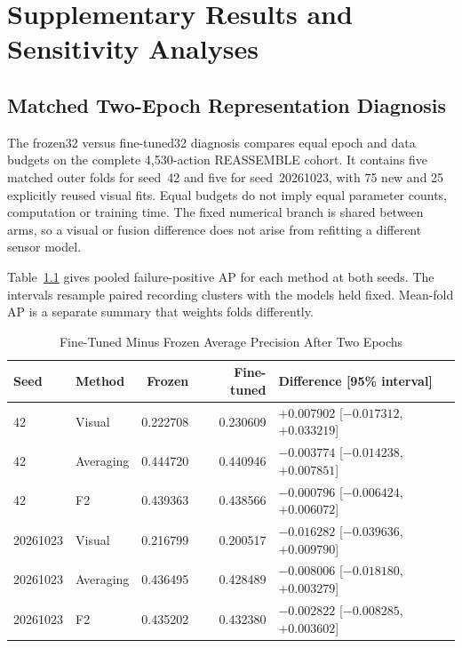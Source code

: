 \chapter{Supplementary Results and Sensitivity Analyses}
\label{app:supplementary-results}

\section{Matched Two-Epoch Representation Diagnosis}
The frozen32 versus fine-tuned32 diagnosis compares equal epoch and data budgets on the
complete 4,530-action REASSEMBLE cohort. It contains five matched outer folds for
seed~42 and five for seed~20261023, with 75 new and 25 explicitly reused visual fits.
Equal budgets do not imply equal parameter counts, computation or training time. The
fixed numerical branch is shared between arms, so a visual or fusion difference does not
arise from refitting a different sensor model.

Table~\ref{tab:twoepoch-supplement} gives pooled failure-positive AP for each method at
both seeds. The intervals resample paired recording clusters with the models held fixed.
Mean-fold AP is a separate summary that weights folds differently.

\begin{table}[htbp]
\caption{Fine-Tuned Minus Frozen Average Precision After Two Epochs}\label{tab:twoepoch-supplement}
\centering\small

\begin{tabular}{llrrl}\hline
Seed & Method & Frozen & Fine-tuned & Difference [95\% interval]\\\hline
42 & Visual &0.222708&0.230609&+0.007902 [$-0.017312$, $+0.033219$]\\
42 & Averaging &0.444720&0.440946&$-0.003774$ [$-0.014238$, $+0.007851$]\\
42 & F2 &0.439363&0.438566&$-0.000796$ [$-0.006424$, $+0.006072$]\\
20261023 & Visual &0.216799&0.200517&$-0.016282$ [$-0.039636$, $+0.009790$]\\
20261023 & Averaging &0.436495&0.428489&$-0.008006$ [$-0.018180$, $+0.003279$]\\
20261023 & F2 &0.435202&0.432380&$-0.002822$ [$-0.008285$, $+0.003602$]\\\hline
\end{tabular}
\end{table}

